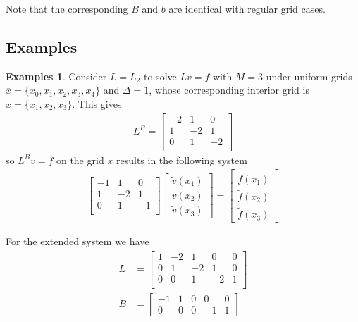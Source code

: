 \documentclass[11pt]{article}
\theoremstyle{definition}
\newtheorem{example}{Examples}[section]
\begin{document}
Note that the corresponding $B$ and $b$ are identical with regular grid cases.

\subsection{Examples}

\begin{example}\label{ex:gaussian-elimination-reflecting-barrier}
	Consider $L = L_{2}$ to solve $L v = f$ with $M = 3$ under uniform grids $\overline{x} = \{x_0, x_1, x_2, x_3, x_4\}$ and $\Delta = 1$, whose corresponding interior grid is $x = \{x_1, x_2, x_3\}$. This gives
	\begin{align}
	L^B = 	 \begin{bmatrix}
	-2 & 1 & 0 \\
	1 & -2 & 1 \\
	0 & 1 & -2 \\
	\end{bmatrix}
	\end{align}
	so $L^B v= f$ on the grid $x$ results in the following system
	\begin{align} \label{eq:extended-system-reflecting-barrier-reduced-system}
	\begin{bmatrix}
	-1 & 1 & 0  \\
	1 & -2 & 1 \\
	0 & 1 & -1 \\
	\end{bmatrix} 	  \begin{bmatrix}
	\tilde{v}(x_1) \\
	\tilde{v}(x_2) \\
	\tilde{v}(x_3)
	\end{bmatrix}
	=
	\begin{bmatrix}
	\tilde{f}(x_1) \\
	\tilde{f}(x_2) \\
	\tilde{f}(x_3)
	\end{bmatrix}
	\end{align}


	For the extended system we have
	\begin{align}
	{L} &=
	\begin{bmatrix}
	1 & -2 & 1 & 0 & 0 \\
	0 & 1 & -2 & 1 & 0 \\
	0 & 0 & 1 & -2 & 1 \\
	\end{bmatrix} \\
	B &= \begin{bmatrix}
	-1 & 1  & 0 & 0 & 0 \\
	0 & 0 & 0 & -1 & 1
	\end{bmatrix}
	\end{align}


\end{example}
\end{document}
